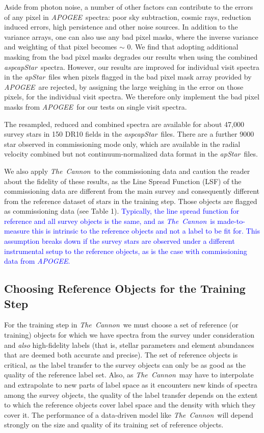 \documentclass[12pt, preprint]{aastex}
\newcommand{\tc}{\textsl{The~Cannon}}
\newcommand{\apogee}{\textsl{APOGEE}}
\newcommand{\aspcapstar}{\textsl{aspcapStar}}
\newcommand{\apstar}{\textsl{apStar}}
\begin{document}
Aside from photon noise, a number of other factors can contribute to the errors of any pixel in \apogee\ spectra: poor sky subtraction, cosmic rays, reduction induced errors, high persistence and other noise sources. In addition to the variance arrays, one can also use any bad pixel masks, where the
inverse variance and weighting of that pixel becomes $\sim$ 0. We find that adopting additional masking from the bad pixel masks degrades our results when using the combined \aspcapstar\ spectra. However, our results are improved for individual visit spectra in the \apstar\ files when pixels flagged in the bad pixel mask array provided by \apogee\ are rejected, by assigning the large weighing in the error on those pixels, for the individual visit spectra. We therefore only implement the bad pixel masks from \apogee\ for our tests on single visit spectra. 

The resampled, reduced and combined spectra are available for about 47,000 survey stars in 150 DR10 fields in the \aspcapstar\ files. There are a further 9000 star observed in commissioning mode only, which are available in the radial velocity combined but not continuum-normalized data format in the \apstar\ files.

We also apply \tc\ to the commissioning data and caution the reader about the fidelity of these results, as the Line Spread Function (LSF) of the commissioning data are different from the main survey and consequently different from the reference dataset of stars in the training step. Those objects are flagged as commissioning data (see Table 1). 
\textcolor{blue}{Typically, the line spread function for reference and all survey objects is the same, and as \tc\ is made-to-measure this is intrinsic to the reference objects and not a label to be fit for. This assumption breaks down if the survey stars are observed under a different instrumental setup to the reference objects, as is the case with commissioning data from \apogee.}  

\subsection{Choosing Reference Objects for the Training Step}
\label{sec:ReferenceObjects}

For the training step in \tc\ we must choose a set of reference (or training) objects for which we have spectra from the survey under consideration and \emph{also} high-fidelity labels (that is, stellar parameters and element abundances that are deemed both accurate and precise).
The set of reference objects is critical, as the label transfer to the survey objects can only be as good as the quality of the reference label set. 
Also, as \tc\ may have to interpolate and extrapolate to new parts of label space as
it encounters new kinds of spectra among the survey objects, the quality
of the label transfer depends on the extent to which the reference objects
cover label space and the density with which they cover it.
The performance of a data-driven model like \tc\ will depend strongly on the size and quality of its training set of reference objects.
\end{document}

